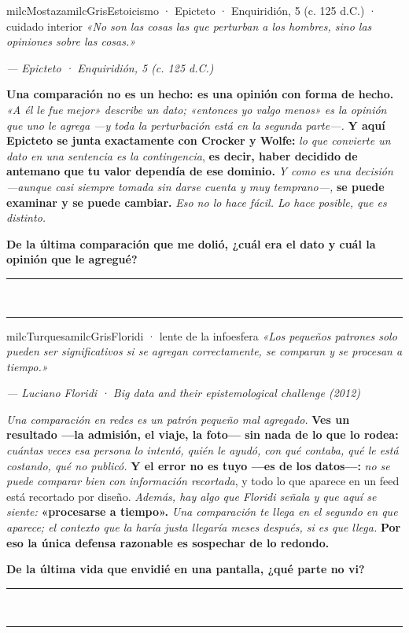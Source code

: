 \documentclass[11pt,letterpaper]{article}
\newcommand{\linead}[1]{\noindent\color{milcLinea}\rule{#1}{0.5pt}\color{milcNegro}}
\begin{document}
\begin{softbox}{milcMostaza}{milcGris}{Estoicismo · Epicteto · Enquiridión, 5 (c. 125 d.C.) · cuidado interior}
\textit{«No son las cosas las que perturban a los hombres, sino las opiniones sobre las cosas.»}

{\footnotesize\itshape\color{milcNegro!70}--- Epicteto · Enquiridión, 5 (c. 125 d.C.)}

\textbf{Una comparación no es un hecho: es una opinión con forma de hecho.} \emph{«A él le fue mejor» describe un dato; «entonces yo valgo menos» es la opinión que uno le agrega ---y toda la perturbación está en la segunda parte---.} \textbf{Y aquí Epicteto se junta exactamente con Crocker y Wolfe:} \emph{lo que convierte un dato en una sentencia es la contingencia}, \textbf{es decir, haber decidido de antemano que tu valor dependía de ese dominio.} \emph{Y como es una decisión ---aunque casi siempre tomada sin darse cuenta y muy temprano---,} \textbf{se puede examinar y se puede cambiar.} \emph{Eso no lo hace fácil. Lo hace posible, que es distinto.}

\textbf{De la última comparación que me dolió, ¿cuál era el dato y cuál la opinión que le agregué?}
\end{softbox}
\linead{\linewidth}\\[1mm]
\linead{\linewidth}

\begin{softbox}{milcTurquesa}{milcGris}{Floridi · lente de la infoesfera}
\textit{«Los pequeños patrones solo pueden ser significativos si se agregan correctamente, se comparan y se procesan a tiempo.»}

{\footnotesize\itshape\color{milcNegro!70}--- Luciano Floridi · Big data and their epistemological challenge (2012)}

\emph{Una comparación en redes es un patrón pequeño mal agregado.} \textbf{Ves un resultado ---la admisión, el viaje, la foto--- sin nada de lo que lo rodea:} \emph{cuántas veces esa persona lo intentó, quién le ayudó, con qué contaba, qué le está costando, qué no publicó.} \textbf{Y el error no es tuyo ---es de los datos---:} \emph{no se puede comparar bien con información recortada}, y todo lo que aparece en un feed está recortado por diseño. \emph{Además, hay algo que Floridi señala y que aquí se siente:} \textbf{«procesarse a tiempo».} \emph{Una comparación te llega en el segundo en que aparece; el contexto que la haría justa llegaría meses después, si es que llega.} \textbf{Por eso la única defensa razonable es sospechar de lo redondo.}

\textbf{De la última vida que envidié en una pantalla, ¿qué parte no vi?}
\end{softbox}
\linead{\linewidth}\\[1mm]
\linead{\linewidth}
\end{document}
